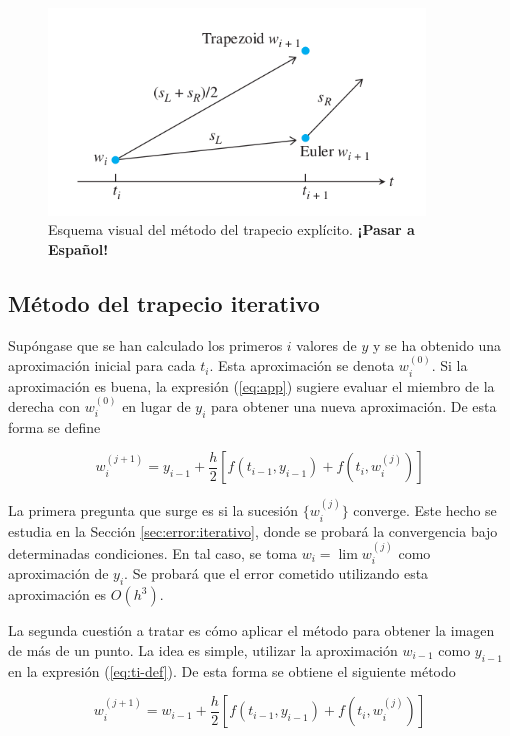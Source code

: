 \documentclass{article}
\theoremstyle{theorem-style}  %
\theoremstyle{definition}
\theoremstyle{example-style}
\begin{document}
		\begin{figure}[H]
			\centering
			\includegraphics[width=10cm]{./Images/trapecio-vs-euler.png}
			\caption{Esquema visual del método del trapecio explícito. \textbf{¡Pasar a Español!}} 
			\label{fig:trapecio-vs-euler}
		\end{figure}

	\subsection{Método del trapecio iterativo}
	
		Supóngase que se han calculado los primeros $i$ valores de $y$ y se ha obtenido una aproximación inicial para cada $t_i$. Esta aproximación se denota $w_i^{(0)}$. Si la aproximación es buena, la expresión (\ref{eq:app}) sugiere evaluar el miembro de la derecha con $w_i^{(0)}$ en lugar de $y_i$ para obtener una nueva aproximación. De esta forma se define
		
		\begin{equation} \label{eq:ti-def}
			w_{i} ^{(j+1)} = y_{i-1} + \frac{h}{2} \left[f(t_{i-1}, y_{i-1}) + f(t_i, w_{i}^{(j)})\right]
		\end{equation}

		La primera pregunta que surge es si la sucesión $\{w_{i}^{(j)}\}$ converge. Este hecho se estudia en la Sección \ref{sec:error:iterativo}, donde se probará la convergencia bajo determinadas condiciones. En tal caso, se toma $w_i = \lim w_i^{(j)}$ como aproximación de $y_i$. Se probará que el error cometido utilizando esta aproximación es $O(h^3)$.
		
		La segunda cuestión a tratar es cómo aplicar el método para obtener la imagen de más de un punto. La idea es simple, utilizar la aproximación $w_{i-1}$ como $y_{i-1}$ en la expresión (\ref{eq:ti-def}). De esta forma se obtiene el siguiente método

		\begin{equation} \label{eq:ti-def-2}
			w_{i} ^{(j+1)} = w_{i-1} + \frac{h}{2} \left[f(t_{i-1}, y_{i-1}) + f(t_i, w_{i}^{(j)})\right]
		\end{equation}
\end{document}
